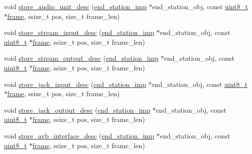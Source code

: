 \begin{DoxyCompactItemize}
\item 
void \hyperlink{classavdecc__lib_1_1configuration__descriptor__imp_a3a852f5a0adb1ca420aeac6bf8fb7896}{store\+\_\+audio\+\_\+unit\+\_\+desc} (\hyperlink{classavdecc__lib_1_1end__station__imp}{end\+\_\+station\+\_\+imp} $\ast$end\+\_\+station\+\_\+obj, const \hyperlink{stdint_8h_aba7bc1797add20fe3efdf37ced1182c5}{uint8\+\_\+t} $\ast$\hyperlink{gst__avb__playbin_8c_ac8e710e0b5e994c0545d75d69868c6f0}{frame}, ssize\+\_\+t pos, size\+\_\+t frame\+\_\+len)
\item 
void \hyperlink{classavdecc__lib_1_1configuration__descriptor__imp_a7fe703c39a504072abd4735cfeeaa75c}{store\+\_\+stream\+\_\+input\+\_\+desc} (\hyperlink{classavdecc__lib_1_1end__station__imp}{end\+\_\+station\+\_\+imp} $\ast$end\+\_\+station\+\_\+obj, const \hyperlink{stdint_8h_aba7bc1797add20fe3efdf37ced1182c5}{uint8\+\_\+t} $\ast$\hyperlink{gst__avb__playbin_8c_ac8e710e0b5e994c0545d75d69868c6f0}{frame}, ssize\+\_\+t pos, size\+\_\+t frame\+\_\+len)
\item 
void \hyperlink{classavdecc__lib_1_1configuration__descriptor__imp_ad04053f0d6c74300147dff1b44e5f3a6}{store\+\_\+stream\+\_\+output\+\_\+desc} (\hyperlink{classavdecc__lib_1_1end__station__imp}{end\+\_\+station\+\_\+imp} $\ast$end\+\_\+station\+\_\+obj, const \hyperlink{stdint_8h_aba7bc1797add20fe3efdf37ced1182c5}{uint8\+\_\+t} $\ast$\hyperlink{gst__avb__playbin_8c_ac8e710e0b5e994c0545d75d69868c6f0}{frame}, ssize\+\_\+t pos, size\+\_\+t frame\+\_\+len)
\item 
void \hyperlink{classavdecc__lib_1_1configuration__descriptor__imp_a37ce6442fc11a319247f8d1bce1d0db3}{store\+\_\+jack\+\_\+input\+\_\+desc} (\hyperlink{classavdecc__lib_1_1end__station__imp}{end\+\_\+station\+\_\+imp} $\ast$end\+\_\+station\+\_\+obj, const \hyperlink{stdint_8h_aba7bc1797add20fe3efdf37ced1182c5}{uint8\+\_\+t} $\ast$\hyperlink{gst__avb__playbin_8c_ac8e710e0b5e994c0545d75d69868c6f0}{frame}, ssize\+\_\+t pos, size\+\_\+t frame\+\_\+len)
\item 
void \hyperlink{classavdecc__lib_1_1configuration__descriptor__imp_aec8c9b5582cc0c82a2310ab930a67a4a}{store\+\_\+jack\+\_\+output\+\_\+desc} (\hyperlink{classavdecc__lib_1_1end__station__imp}{end\+\_\+station\+\_\+imp} $\ast$end\+\_\+station\+\_\+obj, const \hyperlink{stdint_8h_aba7bc1797add20fe3efdf37ced1182c5}{uint8\+\_\+t} $\ast$\hyperlink{gst__avb__playbin_8c_ac8e710e0b5e994c0545d75d69868c6f0}{frame}, ssize\+\_\+t pos, size\+\_\+t frame\+\_\+len)
\item 
void \hyperlink{classavdecc__lib_1_1configuration__descriptor__imp_adce6aa8188c090f25008576e36a389c7}{store\+\_\+avb\+\_\+interface\+\_\+desc} (\hyperlink{classavdecc__lib_1_1end__station__imp}{end\+\_\+station\+\_\+imp} $\ast$end\+\_\+station\+\_\+obj, const \hyperlink{stdint_8h_aba7bc1797add20fe3efdf37ced1182c5}{uint8\+\_\+t} $\ast$\hyperlink{gst__avb__playbin_8c_ac8e710e0b5e994c0545d75d69868c6f0}{frame}, ssize\+\_\+t pos, size\+\_\+t frame\+\_\+len)

\end{DoxyCompactItemize}
